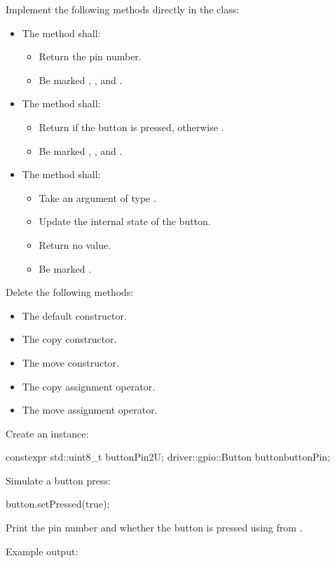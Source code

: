 \begin{parts}
  \item Implement the following methods directly in the class:
  \begin{itemize}
    \item The method  shall:
    \begin{itemize}
      \item Return the pin number.
      \item Be marked , , and \code{[[nodiscard]]}.
    \end{itemize}
    \item The method  shall:
    \begin{itemize}
      \item Return  if the button is pressed, otherwise .
      \item Be marked , , and \code{[[nodiscard]]}.
    \end{itemize}
    \item The method  shall:
    \begin{itemize}
      \item Take an argument of type .
      \item Update the internal state of the button.
      \item Return no value.
      \item Be marked .
    \end{itemize}
  \end{itemize}
  \item Delete the following methods:
  \begin{itemize}
    \item The default constructor.
    \item The copy constructor.
    \item The move constructor.
    \item The copy assignment operator.
    \item The move assignment operator.
  \end{itemize}
  \item Create an instance:
\begin{cppcode}
constexpr std::uint8_t buttonPin{2U};
driver::gpio::Button button{buttonPin};
\end{cppcode}
  Simulate a button press:
\begin{cppcode}
button.setPressed(true);
\end{cppcode}
  Print the pin number and whether the button is pressed using  from
  .
\end{parts}
Example output:

